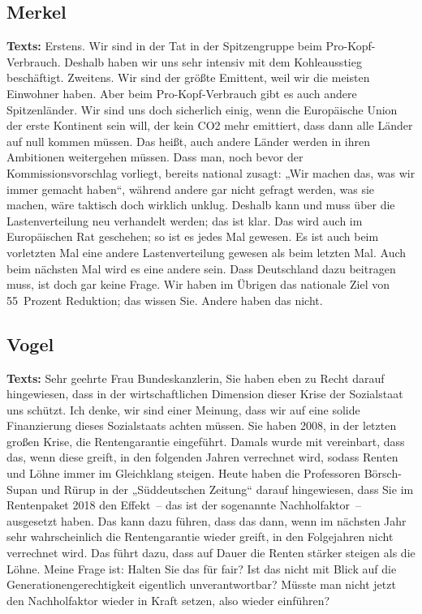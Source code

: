 \documentclass{article}
\begin{document}
\subsection{Merkel}
\noindent\textbf{Texts:} Erstens. Wir sind in der Tat in der Spitzengruppe beim Pro-Kopf-Verbrauch. Deshalb haben wir uns sehr intensiv mit dem Kohleausstieg beschäftigt. Zweitens. Wir sind der größte Emittent, weil wir die meisten Einwohner haben. Aber beim Pro-Kopf-Verbrauch gibt es auch andere Spitzenländer. Wir sind uns doch sicherlich einig, wenn die Europäische Union der erste Kontinent sein will, der kein CO2 mehr emittiert, dass dann alle Länder auf null kommen müssen. Das heißt, auch andere Länder werden in ihren Ambitionen weitergehen müssen. Dass man, noch bevor der Kommissionsvorschlag vorliegt, bereits national zusagt: „Wir machen das, was wir immer gemacht haben“, während andere gar nicht gefragt werden, was sie machen, wäre taktisch doch wirklich unklug. Deshalb kann und muss über die Lastenverteilung neu verhandelt werden; das ist klar. Das wird auch im Europäischen Rat geschehen; so ist es jedes Mal gewesen. Es ist auch beim vorletzten Mal eine andere Lastenverteilung gewesen als beim letzten Mal. Auch beim nächsten Mal wird es eine andere sein. Dass Deutschland dazu beitragen muss, ist doch gar keine Frage. Wir haben im Übrigen das nationale Ziel von 55 Prozent Reduktion; das wissen Sie. Andere haben das nicht.

\subsection{Vogel}
\noindent\textbf{Texts:} Sehr geehrte Frau Bundeskanzlerin, Sie haben eben zu Recht darauf hingewiesen, dass in der wirtschaftlichen Dimension dieser Krise der Sozialstaat uns schützt. Ich denke, wir sind einer Meinung, dass wir auf eine solide Finanzierung dieses Sozialstaats achten müssen. Sie haben 2008, in der letzten großen Krise, die Rentengarantie eingeführt. Damals wurde mit vereinbart, dass das, wenn diese greift, in den folgenden Jahren verrechnet wird, sodass Renten und Löhne immer im Gleichklang steigen. Heute haben die Professoren Börsch-Supan und Rürup in der „Süddeutschen Zeitung“ darauf hingewiesen, dass Sie im Rentenpaket 2018 den Effekt – das ist der sogenannte Nachholfaktor – ausgesetzt haben. Das kann dazu führen, dass das dann, wenn im nächsten Jahr sehr wahrscheinlich die Rentengarantie wieder greift, in den Folgejahren nicht verrechnet wird. Das führt dazu, dass auf Dauer die Renten stärker steigen als die Löhne. Meine Frage ist: Halten Sie das für fair? Ist das nicht mit Blick auf die Generationengerechtigkeit eigentlich unverantwortbar? Müsste man nicht jetzt den Nachholfaktor wieder in Kraft setzen, also wieder einführen?
\end{document}
